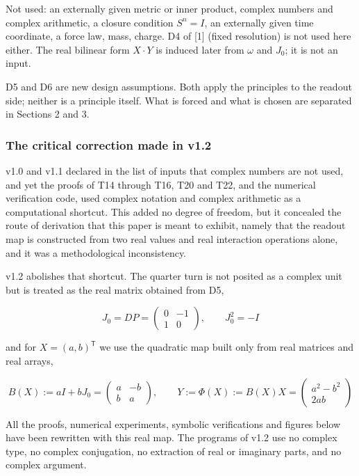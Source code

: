 \documentclass[
  a4paper,
]{article}
\begin{document}
Not used: an externally given metric or inner product, complex numbers
and complex arithmetic, a closure condition \(S^n=I\), an externally
given time coordinate, a force law, mass, charge. D4 of {[}1{]} (fixed
resolution) is not used here either. The real bilinear form \(X\cdot Y\)
is induced later from \(\omega\) and \(J_0\); it is not an input.

D5 and D6 are new design assumptions. Both apply the principles to the
readout side; neither is a principle itself. What is forced and what is
chosen are separated in Sections 2 and 3.

\subsubsection{The critical correction made in
v1.2}\label{the-critical-correction-made-in-v1.2}

v1.0 and v1.1 declared in the list of inputs that complex numbers are
not used, and yet the proofs of T14 through T16, T20 and T22, and the
numerical verification code, used complex notation and complex
arithmetic as a computational shortcut. This added no degree of freedom,
but it concealed the route of derivation that this paper is meant to
exhibit, namely that the readout map is constructed from two real values
and real interaction operations alone, and it was a methodological
inconsistency.

v1.2 abolishes that shortcut. The quarter turn is not posited as a
complex unit but is treated as the real matrix obtained from D5,

\[
J_0=DP=\begin{pmatrix}0&-1\\1&0\end{pmatrix},\qquad J_0^2=-I
\]

and for \(X=(a,b)^{\mathsf T}\) we use the quadratic map built only from
real matrices and real arrays,

\[
B(X):=aI+bJ_0=\begin{pmatrix}a&-b\\b&a\end{pmatrix},\qquad
\boxed{Y:=\Phi(X):=B(X)X=\begin{pmatrix}a^2-b^2\\2ab\end{pmatrix}}
\]

All the proofs, numerical experiments, symbolic verifications and
figures below have been rewritten with this real map. The programs of
v1.2 use no complex type, no complex conjugation, no extraction of real
or imaginary parts, and no complex argument.
\end{document}
